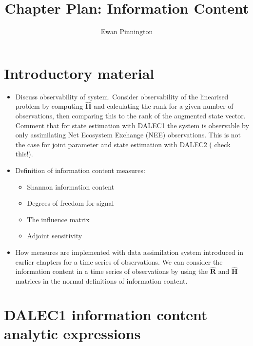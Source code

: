 \documentclass[11pt]{article}
\title{Chapter Plan: Information Content}
\author{Ewan Pinnington}
\begin{document}
\maketitle

\section{Introductory material}

\begin{itemize}
\item Discuss observability of system. Consider observability of the linearised problem by computing $\hat{\textbf{H}}$ and calculating the rank for a given number of observations, then comparing this to the rank of the augmented state vector. Comment that for state estimation with DALEC1 the system is observable by only assimilating Net Ecosystem Exchange (NEE) observations. This is not the case for joint parameter and state estimation with DALEC2 ({\color{red} check this!}).
\item Definition of information content measures:
\begin{itemize}
\item Shannon information content \citep{rodgers2000inverse} 
\item Degrees of freedom for signal \citep{fowler2011measures}
\item The influence matrix \citep{Cardinali2004}
\item Adjoint sensitivity \citep{Langland2004}
\end{itemize}
\item How measures are implemented with data assimilation system introduced in earlier chapters for a time series of observations. We can consider the information content in a time series of observations by using the $\hat{\textbf{R}}$ and $\hat{\textbf{H}}$ matrices in the normal definitions of information content.

\end{itemize}

\section{DALEC1 information content analytic expressions} \label{sec:dalec1}
\end{document}
